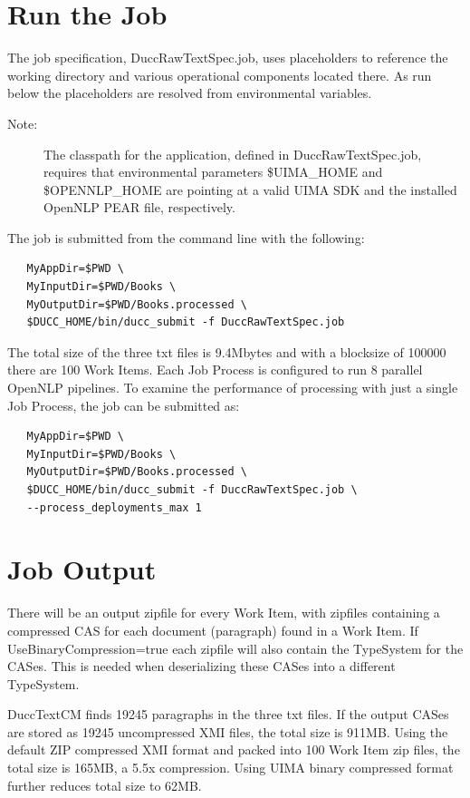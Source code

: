 \section{Run the Job}
The job specification, DuccRawTextSpec.job, uses placeholders to reference the working directory
and various operational components located there. As run below the placeholders are resolved
from environmental variables.

	\begin{description}
    \item[Note:] The classpath for the application, defined in DuccRawTextSpec.job, requires that environmental parameters 
    \$UIMA\_HOME and \$OPENNLP\_HOME are pointing at a valid UIMA SDK and the installed OpenNLP PEAR file, respectively. 
	\end{description}

The job is submitted from the command line with the following:
\begin{verbatim}
   MyAppDir=$PWD \
   MyInputDir=$PWD/Books \
   MyOutputDir=$PWD/Books.processed \
   $DUCC_HOME/bin/ducc_submit -f DuccRawTextSpec.job
\end{verbatim}

The total size of the three txt files is 9.4Mbytes and with a blocksize of 100000 there are 100 Work Items. Each Job Process is 
configured to run 8 parallel OpenNLP pipelines. To examine the performance of processing with just a single Job Process, 
the job can be submitted as:

\begin{verbatim}
   MyAppDir=$PWD \
   MyInputDir=$PWD/Books \
   MyOutputDir=$PWD/Books.processed \
   $DUCC_HOME/bin/ducc_submit -f DuccRawTextSpec.job \
   --process_deployments_max 1
\end{verbatim}

\section{Job Output}
There will be an output zipfile for every Work Item, with zipfiles containing a compressed CAS for each document (paragraph) 
found in a Work Item. If UseBinaryCompression=true each zipfile will also contain the TypeSystem for the CASes. 
This is needed when deserializing these CASes into a different TypeSystem.

DuccTextCM finds 19245 paragraphs in the three txt files. If the output CASes are stored as 19245 uncompressed XMI files, the total size is 911MB. Using the default ZIP compressed XMI format and packed into 100 Work Item zip files, the total size is 165MB, a 5.5x compression. Using UIMA binary compressed format further reduces total size to 62MB.

